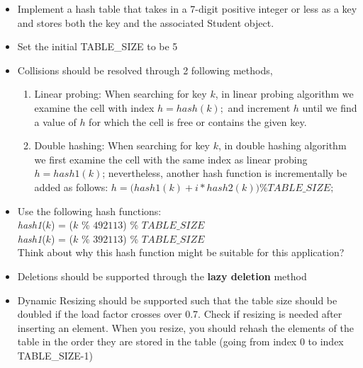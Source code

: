 \documentclass[times, 12pt]{article}
\begin{document}
\begin{itemize}
    \item Implement a hash table that takes in a 7-digit positive integer or less as a key and stores both the key and the associated Student object.
    
    \item Set the initial TABLE\_SIZE to be 5
    
    \item Collisions should be resolved through 2 following methods,
    \begin{enumerate}
        \item Linear probing: When searching for key $k$, in linear probing algorithm we examine the cell with index $h = hash(k);$ and increment $h$ until we find a value of $h$ for which the cell is free or contains the given key.
        \item Double hashing: When searching for key $k$, in double hashing algorithm we first examine the cell with the same index as linear probing $h = hash1(k)$; nevertheless, another hash function is incrementally be added as follows:
        $h = \Big(hash1(k) + i * hash2(k)\Big) \% TABLE\_SIZE;$
    \end{enumerate}

    \item Use the following hash functions:\\ \textit{hash1}($k$) = ($k$ \% $492113$) \% $TABLE\_SIZE$\\ \textit{hash1}($k$) = ($k$ \% $392113$) \% $TABLE\_SIZE$\\
    Think about why this hash function might be suitable for this application?

    \item Deletions should be supported through the \textbf{lazy deletion} method
    
    \item Dynamic Resizing should be supported such that the table size should be doubled if the load factor crosses over 0.7. Check if resizing is needed after inserting an element. When you resize, you should rehash the elements of the table in the order they are stored in the table (going from index 0 to index TABLE\_SIZE-1)
\end{itemize}
\end{document}
